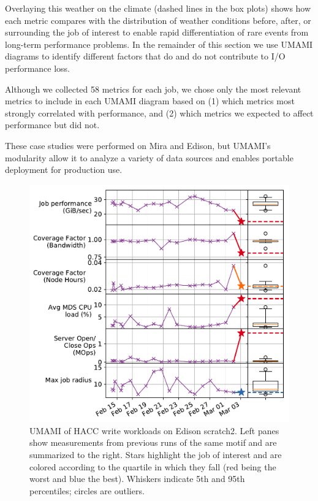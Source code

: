 Overlaying this weather on the climate (dashed lines in the box plots) shows how each metric compares with the distribution of weather conditions before, after, or surrounding the job of interest to enable rapid differentiation of rare events from long-term performance problems.
In the remainder of this section we use UMAMI diagrams to identify different factors that do and do not contribute to I/O performance loss.
{Although we collected 58 metrics for each job, we chose only the most relevant metrics to include in each UMAMI diagram based on (1) which metrics most strongly correlated with performance, and (2) which metrics we expected to affect performance but did not.

These case studies were performed on Mira and Edison, but UMAMI's modularity allow it to analyze a variety of data sources and enables portable deployment for production use.

\begin{figure}[t]
    \centering
    \includegraphics[width=1.0\columnwidth]{figs/umami-scratch2-hacc-write.pdf}
    \vspace{-.25in}
    \caption{UMAMI of HACC write workloads on Edison scratch2.
    Left panes show measurements from previous runs of the same motif and are summarized to the right.
    Stars highlight the job of interest and are colored according to the quartile in which they fall (red being the worst and blue the best).
    Whiskers indicate 5th and 95th percentiles; circles are outliers.}
    \label{fig:umami-scratch2-hacc-write}
    \vspace{-.2in}
\end{figure}

}
